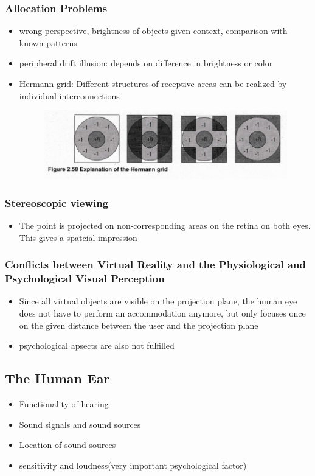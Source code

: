 \documentclass{standalone}
\begin{document}
\subsubsection*{Allocation Problems}
\begin{itemize}
	\item wrong perspective, brightness of objects given context, comparison with known patterns
	\item peripheral drift illusion: depends on difference in brightness or color
	\item Hermann grid: Different structures of receptive areas can be realized by individual interconnections
		\begin{figure}[H]
			\centering
			\includegraphics[width = 0.7\linewidth]{Figures/2_58.png}
		\end{figure}
\end{itemize}
\subsubsection*{Stereoscopic viewing}
\begin{itemize}
	\item The point is projected on non-corresponding areas on the retina on both eyes. This gives a spatcial impression
\end{itemize}
\subsubsection{Conflicts between Virtual Reality and the Physiological and Psychological Visual Perception}
\begin{itemize}
	\item Since all virtual objects are visible on the projection plane, the human eye does not have to perform an accommodation anymore, but only focuses once on the given distance between the user and the projection plane
	\item psychological apsects are also not fulfilled
\end{itemize}
\subsection{The Human Ear}
\begin{itemize}
	\item Functionality of hearing
	\item Sound signals and sound sources
	\item Location of sound sources
	\item sensitivity and loudness(very important psychological factor)
\end{itemize}
\end{document}
